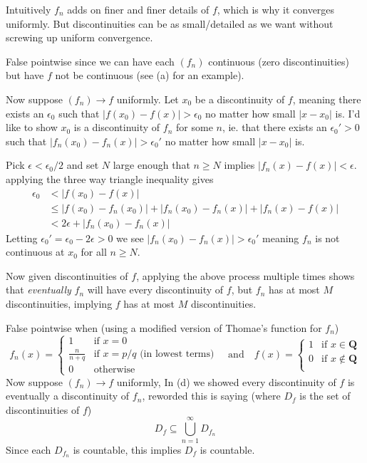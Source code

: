 \begin{solution}
{    Intuitively $f_n$ adds on finer and finer details of $f$, which is why it converges uniformly. But discontinuities can be as small/detailed as we want without screwing up uniform convergence.
  \item False pointwise since we can have each $(f_n)$ continuous (zero discontinuities) but have $f$ not be continuous (see (a) for an example).

    Now suppose $(f_n) \to f$ uniformly. Let $x_0$ be a discontinuity of $f$, meaning there exists an $\epsilon_0$ such that $|f(x_0)-f(x)| > \epsilon_0$ no matter how small $|x-x_0|$ is.
    I'd like to show $x_0$ is a discontinuity of $f_n$ for some $n$, ie. that there exists an $\epsilon_0'>0$ such that $|f_n(x_0)-f_n(x)|>\epsilon_0'$ no matter how small $|x-x_0|$ is.

    Pick $\epsilon<\epsilon_0/2$ and set $N$ large enough that $n \ge N$ implies $|f_n(x)-f(x)|<\epsilon$. applying the three way triangle inequality gives
    $$
    \begin{aligned}
    \epsilon_0
    &< |f(x_0) - f(x)| \\
    &\le |f(x_0) - f_n(x_0)| + |f_n(x_0) - f_n(x)| + |f_n(x) - f(x)| \\
    &< 2\epsilon + |f_n(x_0) - f_n(x)|
    \end{aligned}
    $$
    Letting $\epsilon_0' = \epsilon_0-2\epsilon > 0$ we see $|f_n(x_0) - f_n(x)| > \epsilon_0'$ meaning $f_n$ is not continuous at $x_0$ for all $n \ge N$.

    Now given discontinuities of $f$, applying the above process multiple times shows that \emph{eventually} $f_n$ will have every discontinuity of $f$, but $f_n$ has at most $M$ discontinuities, implying $f$ has at most $M$ discontinuities.
  \item False pointwise when (using a modified version of Thomae's function for $f_n$)
    $$
    f_n(x) = \begin{cases}
      1 &\text{if $x = 0$} \\
      \frac{n}{n+q} &\text{if $x = p/q$ (in lowest terms)} \\
      0 &\text{otherwise}
    \end{cases}
    \quad\text{and}\quad
    f(x) = \begin{cases}
      1 &\text{if $x \in \mathbf{Q}$} \\
      0 &\text{if $x \notin \mathbf{Q}$} \\
    \end{cases}
    $$
    Now suppose $(f_n) \to f$ uniformly, In (d) we showed every discontinuity of $f$ is eventually a discontinuity of $f_n$, reworded this is saying (where $D_f$ is the set of discontinuities of $f$)
    $$
    D_f \subseteq \bigcup_{n=1}^\infty D_{f_{n}}
    $$
    Since each $D_{f_n}$ is countable, this implies $D_f$ is countable.
  }
\end{solution}
